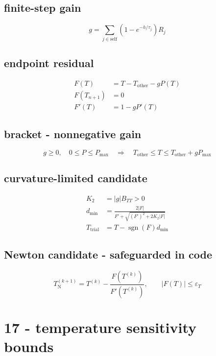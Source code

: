 \subsection*{finite-step gain}
\[
\displaystyle g=\sum_{j\in\mathrm{self}}(1-e^{-h/\tau_j})R_j
\]

\subsection*{endpoint residual}
\[
\displaystyle \begin{aligned}F(T)&=T-T_{\mathrm{other}}-gP(T)\\F(T_{n+1})&=0\\F'(T)&=1-gP'(T)\end{aligned}
\]

\subsection*{bracket - nonnegative gain}
\[
\displaystyle g\ge0,\quad0\le P\le P_{\max}\quad\Rightarrow\quad T_{\mathrm{other}}\le T\le T_{\mathrm{other}}+gP_{\max}
\]

\subsection*{curvature-limited candidate}
\[
\displaystyle \begin{aligned}K_2&=|g|B_{TT}>0\\d_{\min}&=\frac{2|F|}{F'+\sqrt{(F')^2+2K_2|F|}}\\T_{\mathrm{trial}}&=T-\operatorname{sgn}(F)d_{\min}\end{aligned}
\]

\subsection*{Newton candidate - safeguarded in code}
\[
\displaystyle T^{(k+1)}_{\mathrm N}=T^{(k)}-\frac{F(T^{(k)})}{F'(T^{(k)})},\qquad |F(T)|\le\varepsilon_T
\]

\clearpage
\section*{17 - temperature sensitivity bounds}

